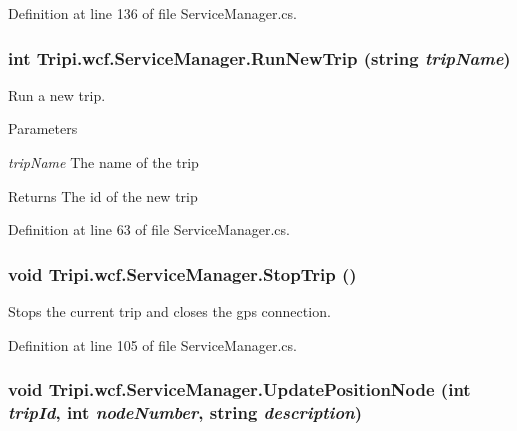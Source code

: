 Definition at line 136 of file ServiceManager.cs.\hypertarget{class_tripi_1_1wcf_1_1_service_manager_aa7a1b427d211e36ec4173a41d7df66e6}{
\subsubsection[{RunNewTrip}]{\setlength{\rightskip}{0pt plus 5cm}int Tripi.wcf.ServiceManager.RunNewTrip (string {\em tripName})}}
\label{class_tripi_1_1wcf_1_1_service_manager_aa7a1b427d211e36ec4173a41d7df66e6}


Run a new trip. 
\begin{DoxyParams}{Parameters}
\item[{\em tripName}]The name of the trip\end{DoxyParams}
\begin{DoxyReturn}{Returns}
The id of the new trip
\end{DoxyReturn}


Definition at line 63 of file ServiceManager.cs.\hypertarget{class_tripi_1_1wcf_1_1_service_manager_a0de7350349e729fbef9811a28976b1a3}{
\subsubsection[{StopTrip}]{\setlength{\rightskip}{0pt plus 5cm}void Tripi.wcf.ServiceManager.StopTrip ()}}
\label{class_tripi_1_1wcf_1_1_service_manager_a0de7350349e729fbef9811a28976b1a3}


Stops the current trip and closes the gps connection. 

Definition at line 105 of file ServiceManager.cs.\hypertarget{class_tripi_1_1wcf_1_1_service_manager_a08f7d328c2d5a4d7906a8d4acb6e197d}{
\subsubsection[{UpdatePositionNode}]{\setlength{\rightskip}{0pt plus 5cm}void Tripi.wcf.ServiceManager.UpdatePositionNode (int {\em tripId}, \/  int {\em nodeNumber}, \/  string {\em description})}}
\label{class_tripi_1_1wcf_1_1_service_manager_a08f7d328c2d5a4d7906a8d4acb6e197d}



